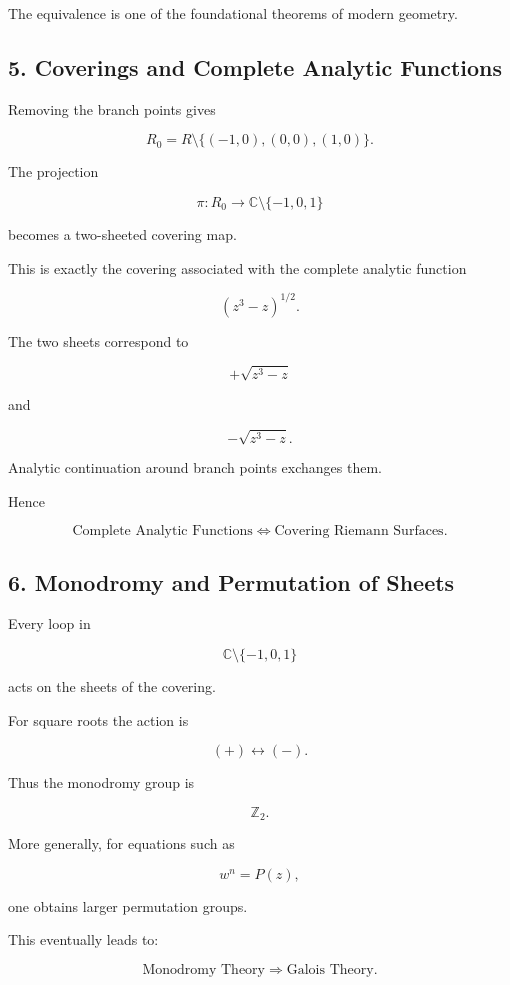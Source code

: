 \documentclass[12pt,a4paper]{article}
\theoremstyle{notespace}
\begin{document}
The equivalence is one of the foundational theorems of modern geometry.

\bigskip

\subsection{5. Coverings and Complete Analytic Functions}

Removing the branch points gives

\[
R_0
=
R
\setminus
\{(-1,0),(0,0),(1,0)\}.
\]

The projection

\[
\pi:R_0\to\mathbb C\setminus\{-1,0,1\}
\]

becomes a two-sheeted covering map.

This is exactly the covering associated with the complete analytic function

\[
(z^3-z)^{1/2}.
\]

The two sheets correspond to

\[
+\sqrt{z^3-z}
\]

and

\[
-\sqrt{z^3-z}.
\]

Analytic continuation around branch points exchanges them.

Hence

\[
\boxed{
	\text{Complete Analytic Functions}
	\Longleftrightarrow
	\text{Covering Riemann Surfaces}.
}
\]

\bigskip

\subsection{6. Monodromy and Permutation of Sheets}

Every loop in

\[
\mathbb C\setminus\{-1,0,1\}
\]

acts on the sheets of the covering.

For square roots the action is

\[
(+)\leftrightarrow(-).
\]

Thus the monodromy group is

\[
\mathbb Z_2.
\]

More generally, for equations such as

\[
w^n=P(z),
\]

one obtains larger permutation groups.

This eventually leads to:

\[
\boxed{
	\text{Monodromy Theory}
	\Longrightarrow
	\text{Galois Theory}.
}
\]
\end{document}
